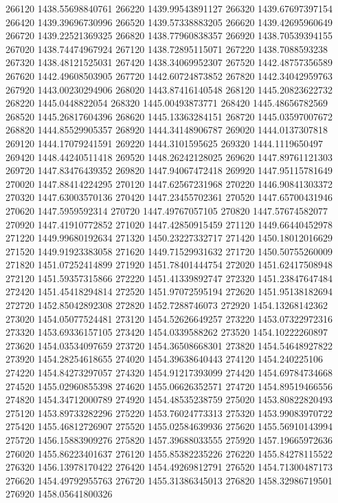 {266120 1438.55698840761
266220 1439.99543891127
266320 1439.67697397154
266420 1439.39696730996
266520 1439.57338883205
266620 1439.42695960649
266720 1439.22521369325
266820 1438.77960838357
266920 1438.70539394155
267020 1438.74474967924
267120 1438.72895115071
267220 1438.7088593238
267320 1438.48121525031
267420 1438.34069952307
267520 1442.48757356589
267620 1442.49608503905
267720 1442.60724873852
267820 1442.34042959763
267920 1443.00230294906
268020 1443.87416140548
268120 1445.20823622732
268220 1445.0448822054
268320 1445.00493873771
268420 1445.48656782569
268520 1445.26817604396
268620 1445.13363284151
268720 1445.03597007672
268820 1444.85529905357
268920 1444.34148906787
269020 1444.0137307818
269120 1444.17079241591
269220 1444.3101595625
269320 1444.1119650497
269420 1448.44240511418
269520 1448.26242128025
269620 1447.89761121303
269720 1447.83476439352
269820 1447.94067472418
269920 1447.95115781649
270020 1447.88414224295
270120 1447.62567231968
270220 1446.90841303372
270320 1447.63003570136
270420 1447.23455702361
270520 1447.65700431946
270620 1447.5959592314
270720 1447.49767057105
270820 1447.57674582077
270920 1447.41910772852
271020 1447.42850915459
271120 1449.66440452978
271220 1449.99680192634
271320 1450.23227332717
271420 1450.18012016629
271520 1449.91923383058
271620 1449.71529931632
271720 1450.50755260009
271820 1451.07252414899
271920 1451.78401444754
272020 1451.62417508948
272120 1451.59357315866
272220 1451.41339892747
272320 1451.23847647484
272420 1451.45418294814
272520 1451.97072595194
272620 1451.95138182694
272720 1452.85042892308
272820 1452.7288746073
272920 1454.13268142362
273020 1454.05077524481
273120 1454.52626649257
273220 1453.07322972316
273320 1453.69336157105
273420 1454.0339588262
273520 1454.10222260897
273620 1454.03534097659
273720 1454.36508668301
273820 1454.54648927822
273920 1454.28254618655
274020 1454.39638640443
274120 1454.240225106
274220 1454.84273297057
274320 1454.91217393099
274420 1454.69784734668
274520 1455.02960855398
274620 1455.06626352571
274720 1454.89519466556
274820 1454.34712000789
274920 1454.48535238759
275020 1453.80822820493
275120 1453.89733282296
275220 1453.76024773313
275320 1453.99083970722
275420 1455.46812726907
275520 1455.02584639936
275620 1455.56910143994
275720 1456.15883909276
275820 1457.39688033555
275920 1457.19665972636
276020 1455.86223401637
276120 1455.85382235226
276220 1455.84278115522
276320 1456.13978170422
276420 1454.49269812791
276520 1454.71300487173
276620 1454.49792955763
276720 1455.31386345013
276820 1458.32986719501
276920 1458.05641800326
}
